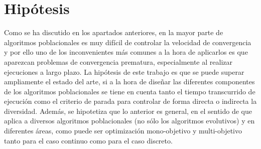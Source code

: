 \section{Hipótesis}

Como se ha discutido en los apartados anteriores, en la mayor parte de algoritmos poblacionales es muy difícil de controlar
la velocidad de convergencia y por ello uno de los inconvenientes más comunes a la hora de aplicarlos es que aparezcan problemas
de convergencia prematura, especialmente al realizar ejecuciones a largo plazo.
%
La hipótesis de este trabajo es que se puede superar ampliamente el estado del arte, si a la hora de diseñar las diferentes
componentes de los algoritmos poblacionales se tiene en cuenta tanto el tiempo transcurrido de ejecución como el criterio de parada
para controlar de forma directa o indirecta la diversidad.
%
Además, se hipotetiza que lo anterior es general, en el sentido de que aplica a diversos algoritmos poblacionales (no sólo los 
algoritmos evolutivos) y en diferentes áreas, como puede ser optimización mono-objetivo y multi-objetivo tanto para el caso
continuo como para el caso discreto.
